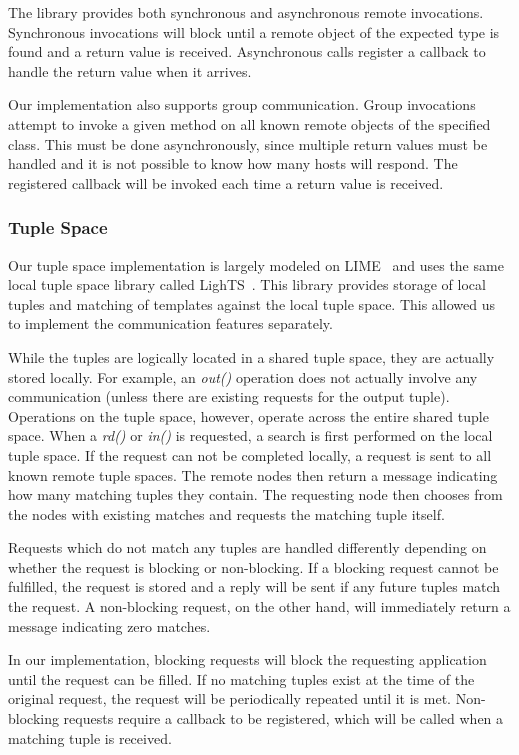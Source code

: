 The library provides both synchronous and asynchronous remote invocations. Synchronous invocations will block until a remote object of the expected type is found and a return value is received. Asynchronous calls register a callback to handle the return value when it arrives.

Our implementation also supports group communication. Group invocations attempt to invoke a given method on all known remote objects of the specified class. This must be done asynchronously, since multiple return values must be handled and it is not possible to know how many hosts will respond. The registered callback will be invoked each time a return value is received.

\subsubsection{Tuple Space}

Our tuple space implementation is largely modeled on LIME~\cite{lime} and uses the same local tuple space library called LighTS~\cite{lights}. This library provides storage of local tuples and matching of templates against the local tuple space. This allowed us to implement the communication features separately.

While the tuples are logically located in a shared tuple space, they are actually stored locally. For example, an \textit{out()} operation does not actually involve any communication (unless there are existing requests for the output tuple). Operations on the tuple space, however, operate across the entire shared tuple space. When a \textit{rd()} or \textit{in()} is requested, a search is first performed on the local tuple space. If the request can not be completed locally, a request is sent to all known remote tuple spaces. The remote nodes then return a message indicating how many matching tuples they contain. The requesting node then chooses from the nodes with existing matches and requests the matching tuple itself.

Requests which do not match any tuples are handled differently depending on whether the request is blocking or non-blocking. If a blocking request cannot be fulfilled, the request is stored and a reply will be sent if any future tuples match the request. A non-blocking request, on the other hand, will immediately return a message indicating zero matches.

In our implementation, blocking requests will block the requesting application until the request can be filled. If no matching tuples exist at the time of the original request, the request will be periodically repeated until it is met. Non-blocking requests require a callback to be registered, which will be called when a matching tuple is received. 

